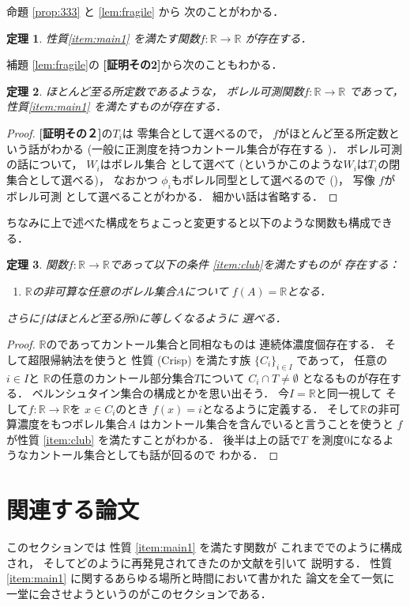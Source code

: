 \documentclass[leqno, a4paper, 12pt]{jsarticle}
\newtheorem{thm}{定理}
\theoremstyle{definition}
\newcommand{\rr}{\mathbb{R}}
\newcommand{\mysei}{\textup{(Crisp)}}
\begin{document}
命題
\ref{prop:333}
と
\ref{lem:fragile}
から
次のことがわかる．
\begin{thm}\label{thm:main1}
性質\ref{item:main1}
を満たす関数$f\colon \rr\to \rr$
が存在する．
\end{thm}

補題
\ref{lem:fragile}の
\textbf{[証明その2]}から次のこともわかる．
\begin{thm}\label{thm:main2}
ほとんど至る所定数であるような，
ボレル可測関数$f\colon \rr\to \rr$
であって，
性質\ref{item:main1}
を満たすものが存在する．
\end{thm}
\begin{proof}
\textbf{[証明その２]}の$T_{i}$は
零集合として選べるので，
$f$がほとんど至る所定数という話がわかる
(一般に正測度を持つカントール集合が存在する
\cite{Den2})．
ボレル可測の話について，
$W_{i}$はボレル集合
として選べて
(というかこのような$W_{i}$は$T_{i}$の閉集合として選べる)，
なおかつ
$\phi_{i}$もボレル同型として選べるので
(\cite{Den3})，
写像
$f$がボレル可測
として選べることがわかる．
細かい話は省略する．
\end{proof}

ちなみに上で述べた構成をちょこっと変更すると以下のような関数も構成できる．
\begin{thm}\label{thm:borel}
関数$f\colon \rr\to \rr$であって以下の条件
\ref{item:club}を満たすものが
存在する：
\begin{enumerate}[label=\textup{($\clubsuit$)}]
\item\label{item:club}
$\rr$の非可算な任意のボレル集合$A$について
$f(A)=\rr$となる．
\end{enumerate}
さらに$f$はほとんど至る所$0$に等しくなるように
選べる．
\end{thm}
\begin{proof}
$\rr$のであってカントール集合と同相なものは
連続体濃度個存在する．
そして超限帰納法を使うと
性質
\mysei
を満たす族
$\{C_{i}\}_{i\in I}$
であって，
任意の$i\in I$と
$\rr$の任意のカントール部分集合$T$について
$C_{i}\cap T\neq \emptyset$
となるものが存在する．
ベルンシュタイン集合の構成とかを思い出そう．
今$I=\rr$と同一視して
そして$f\colon\rr\to \rr$を
$x\in C_{i}$のとき
$f(x)=i$となるように定義する．
そして$\rr$の非可算濃度をもつボレル集合$A$
はカントール集合を含んでいると言うことを使うと
$f$が性質
\ref{item:club}
を満たすことがわかる．
後半は上の話で$T$
を測度$0$になるようなカントール集合としても話が回るので
わかる．
\end{proof}

\section{関連する論文}\label{sec:2}
このセクションでは
性質
\ref{item:main1}
を満たす関数が
これまででのように構成され，
そしてどのように再発見されてきたのか文献を引いて
説明する．
性質
\ref{item:main1}
に関するあらゆる場所と時間において書かれた
論文を全て一気に一堂に会させようというのがこのセクションである．
\end{document}
